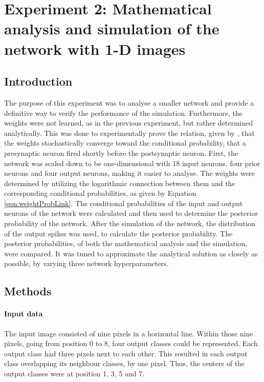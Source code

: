 \section{Experiment 2: Mathematical analysis and simulation of the network with 1-D images}
\label{section:1D}

\subsection{Introduction}

The purpose of this experiment was to analyse a smaller network and provide a definitive way to verify the performance of the simulation. Furthermore, the weights were not learned, as in the previous experiment, but rather determined analytically. This was done to experimentally prove the relation, given by \citet{nessler}, that the weights stochastically converge toward the conditional probability, that a presynaptic neuron fired shortly before the postsynaptic neuron.
First, the network was scaled down to be one-dimensional with 18 input neurons, four prior neurons and four output neurons, making it easier to analyse. The weights were determined by utilizing the logarithmic connection between them and the corresponding conditional probabilities, as given by Equation \ref{eqn:weightProbLink}. The conditional probabilities of the input and output neurons of the network  were calculated and then used to determine the posterior probability of the network. After the simulation of the network, the distribution of the output spikes was used, to calculate the posterior probability. The posterior probabilities, of both the mathematical analysis and the simulation, were compared. It was tuned to approximate the analytical solution as closely as possible, by varying three network hyperparameters.

\subsection{Methods}

\paragraph{Input data}
The input image consisted of nine pixels in a horizontal line. Within those nine pixels, going from position 0 to 8, four output classes could be represented. Each output class had three pixels next to each other. This resulted in each output class overlapping its neighbour classes, by one pixel. Thus, the centers of the output classes were at position 1, 3, 5 and 7.
 
